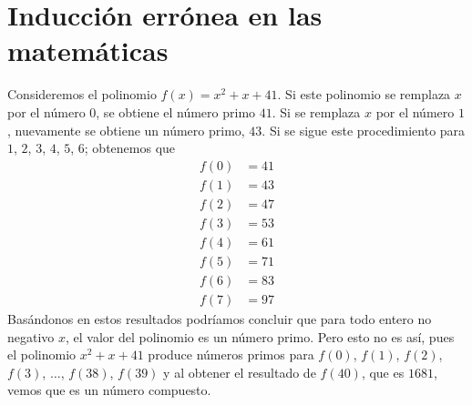 \section{Inducción errónea en las matemáticas}

\begin{example}
    Consideremos el polinomio $f(x)=x^2+x+41$. Si este polinomio se remplaza $x$ por el número $0$, se obtiene el número primo $41$. Si se remplaza $x$ por el número $1$, nuevamente se obtiene un número primo, $43$. Si se sigue este procedimiento para $1$, $2$, $3$, $4$, $5$, $6$; obtenemos que
    \begin{align*}
        f(0) &=41 \\
        f(1) &=43 \\
        f(2) &=47 \\
        f(3) &=53 \\
        f(4) &=61 \\
        f(5) &=71 \\
        f(6) &=83 \\
        f(7) &=97
    \end{align*}
    Basándonos en estos resultados podríamos concluir que para todo entero no negativo $x$, el valor del polinomio es un número primo. Pero esto no es así, pues el polinomio $x^2+x+41$ produce números primos para $f(0)$, $f(1)$, $f(2)$, $f(3)$, $\dots$, $f(38)$, $f(39)$ y al obtener el resultado de $f(40)$, que es $1681$, vemos que es un número compuesto.
\end{example}

